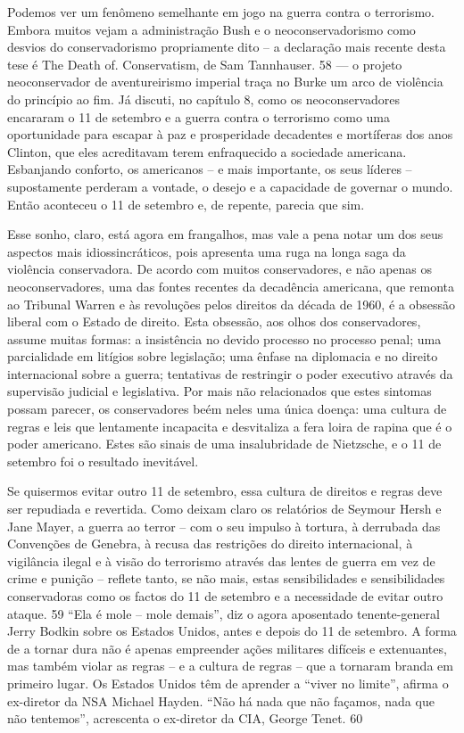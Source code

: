 Podemos ver um fenômeno semelhante em jogo na guerra contra o terrorismo. Embora muitos vejam a administração Bush e o neoconservadorismo como desvios do conservadorismo propriamente dito – a declaração mais recente desta tese é The Death of. Conservatism, de Sam Tannhauser.
 {\color{blue} 58}  
— o projeto neoconservador de aventureirismo imperial traça no Burke um arco de violência do princípio ao fim. Já discuti, no capítulo 8, como os neoconservadores encararam o 11 de setembro e a guerra contra o terrorismo como uma oportunidade para escapar à paz e prosperidade decadentes e mortíferas dos anos Clinton, que eles acreditavam terem enfraquecido a sociedade americana. Esbanjando conforto, os americanos – e mais importante, os seus líderes – supostamente perderam a vontade, o desejo e a capacidade de governar o mundo. Então aconteceu o 11 de setembro e, de repente, parecia que sim.
 
\par
 
Esse sonho, claro, está agora em frangalhos, mas vale a pena notar um dos seus aspectos mais idiossincráticos, pois apresenta uma ruga na longa saga da violência conservadora. De acordo com muitos conservadores, e não apenas os neoconservadores, uma das fontes recentes da decadência americana, que remonta ao Tribunal Warren e às revoluções pelos direitos da década de 1960, é a obsessão liberal com o Estado de direito. Esta obsessão, aos olhos dos conservadores, assume muitas formas: a insistência no devido processo no processo penal; uma parcialidade em litígios sobre legislação; uma ênfase na diplomacia e no direito internacional sobre a guerra; tentativas de restringir o poder executivo através da supervisão judicial e legislativa. Por mais não relacionados que estes sintomas possam parecer, os conservadores beém neles uma única doença: uma cultura de regras e leis que lentamente incapacita e desvitaliza a fera loira de rapina que é o poder americano. Estes são sinais de uma insalubridade de Nietzsche, e o 11 de setembro foi o resultado inevitável.
 
\par
 
Se quisermos evitar outro 11 de setembro, essa cultura de direitos e regras deve ser repudiada e revertida. Como deixam claro os relatórios de Seymour Hersh e Jane Mayer, a guerra ao terror – com o seu impulso à tortura, à derrubada das Convenções de Genebra, à recusa das restrições do direito internacional, à vigilância ilegal e à visão do terrorismo através das lentes de guerra em vez de crime e punição – reflete tanto, se não mais, estas sensibilidades e sensibilidades conservadoras como os factos do 11 de setembro e a necessidade de evitar outro ataque.
 {\color{blue} 59}  
“Ela é mole – mole demais”, diz o agora aposentado tenente-general Jerry Bodkin sobre os Estados Unidos, antes e depois do 11 de setembro. A forma de a tornar dura não é apenas empreender ações militares difíceis e extenuantes, mas também violar as regras – e a cultura de regras – que a tornaram branda em primeiro lugar. Os Estados Unidos têm de aprender a “viver no limite”, afirma o ex-diretor da NSA Michael Hayden. “Não há nada que não façamos, nada que não tentemos”, acrescenta o ex-diretor da CIA, George Tenet.
 {\color{blue} 60}  

